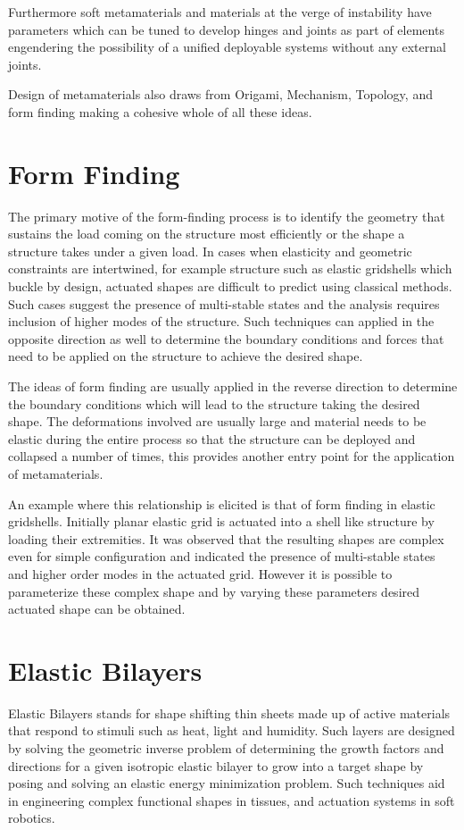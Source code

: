 Furthermore soft metamaterials and materials at the verge of instability have parameters which can be tuned to develop hinges and joints as part of elements engendering the possibility of a unified deployable systems without any external joints.\cite{Baardink489, Rock}

Design of metamaterials also draws from Origami, Mechanism, Topology, and form finding making a cohesive whole of all these ideas\cite{Filip, Rock}.

\section{Form Finding}
The primary motive of the form-finding process is to identify the geometry that sustains the load coming on the structure most efficiently or the shape a structure takes under a given load. In cases when elasticity and geometric constraints are intertwined, for example structure such as elastic gridshells which buckle by design, actuated shapes are difficult to predict using classical methods. Such cases suggest the presence of multi-stable states and the analysis requires inclusion of higher modes of the structure. Such techniques can applied in the opposite direction as well to determine the boundary conditions and forces that need to be applied on the structure to achieve the desired shape.\cite{Baek75} 

The ideas of form finding are usually applied in the reverse direction to determine the boundary conditions which will lead to the structure taking the desired shape. The deformations involved are usually large and material needs to be elastic during the entire process so that the structure can be deployed and collapsed a number of times, this provides another entry point for the application of metamaterials.

An example where this relationship is elicited is that of form finding in elastic gridshells. Initially planar elastic grid is actuated into a shell like structure by loading their extremities. It was observed that the resulting shapes are complex even for simple configuration and indicated the presence of multi-stable states and higher order modes in the actuated grid. However it is possible to parameterize these complex shape and by varying these parameters desired actuated shape can be obtained\cite{Baek75}.

\section{Elastic Bilayers}
Elastic Bilayers stands for shape shifting thin sheets made up of active materials that respond to stimuli such as heat, light and humidity. Such layers are designed by solving the geometric inverse problem of determining the growth factors and directions for a given isotropic elastic bilayer to grow into a target shape by posing and solving an elastic energy minimization problem. Such techniques aid in engineering complex functional shapes in tissues, and actuation systems in soft robotics.\cite{va}

